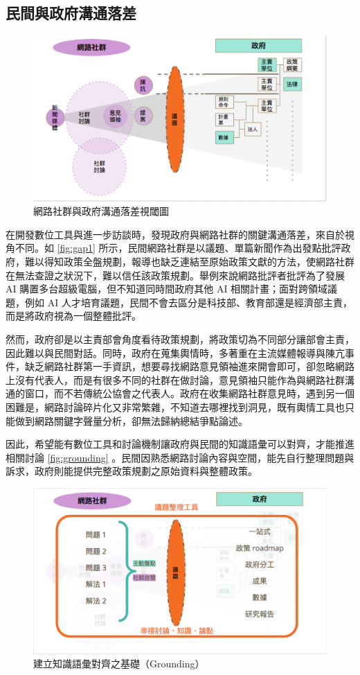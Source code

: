 \documentclass[12pt,a4paper]{article}
\begin{document}
\subsection{民間與政府溝通落差}
\label{sec:orgc55b9c1}
\begin{figure}[htbp]
\centering
\includegraphics[width=.9\linewidth]{./images/gap1.png}
\caption{\label{fig:org36b78ad}
網路社群與政府溝通落差視閾圖}
\end{figure}

在開發數位工具與進一步訪談時，發現政府與網路社群的關鍵溝通落差，來自於視角不同。如 \ref{fig:gap1} 所示，民間網路社群是以議題、單篇新聞作為出發點批評政府，難以得知政策全盤規劃，報導也缺乏連結至原始政策文獻的方法，使網路社群在無法查證之狀況下，難以信任該政策規劃。舉例來說網路批評者批評為了發展 AI 購置多台超級電腦，但不知道同時間政府其他 AI 相關計畫；面對跨領域議題，例如 AI 人才培育議題，民間不會去區分是科技部、教育部還是經濟部主責，而是將政府視為一個整體批評。

然而，政府卻是以主責部會角度看待政策規劃，將政策切為不同部分讓部會主責，因此難以與民間對話。同時，政府在蒐集輿情時，多著重在主流媒體報導與陳亢事件，缺乏網路社群第一手資訊，想要尋找網路意見領袖進來開會即可，卻忽略網路上沒有代表人，而是有很多不同的社群在做討論，意見領袖只能作為與網路社群溝通的窗口，而不若傳統公協會之代表人。政府在收集網路社群意見時，遇到另一個困難是，網路討論碎片化又非常繁雜，不知道去哪裡找到洞見，既有輿情工具也只能做到網路關鍵字聲量分析，卻無法歸納總結爭點論述。

因此，希望能有數位工具和討論機制讓政府與民間的知識語彙可以對齊，才能推進相關討論 \ref{fig:grounding} 。民間因熟悉網路討論內容與空間，能先自行整理問題與訴求，政府則能提供完整政策規劃之原始資料與整體政策。

\begin{figure}[htbp]
\centering
\includegraphics[width=.9\linewidth]{./images/gap2.png}
\caption{\label{fig:orgf1b9e5e}
建立知識語彙對齊之基礎（Grounding）}
\end{figure}
\end{document}
